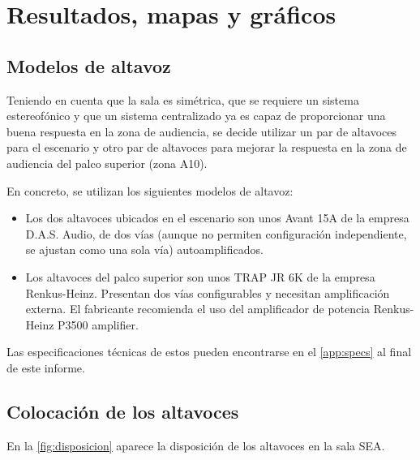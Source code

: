\documentclass{article}
\begin{document}
\section{Resultados, mapas y gráficos}

\subsection{Modelos de altavoz}
Teniendo en cuenta que la sala es simétrica, que se requiere un sistema estereofónico y que un sistema centralizado ya es capaz de proporcionar una buena respuesta en la zona de audiencia, se decide utilizar un par de altavoces para el escenario y otro par de altavoces para mejorar la respuesta en la zona de audiencia del palco superior (zona A10).

En concreto, se utilizan los siguientes modelos de altavoz:

\begin{itemize}
    \item Los dos altavoces ubicados en el escenario son unos Avant 15A de la empresa D.A.S. Audio, de dos vías (aunque no permiten configuración independiente, se ajustan como una sola vía) autoamplificados.
    \item Los altavoces del palco superior son unos TRAP JR 6K de la empresa Renkus-Heinz. Presentan dos vías configurables y necesitan amplificación externa. El fabricante recomienda el uso del amplificador de potencia Renkus-Heinz P3500 amplifier.
\end{itemize}

Las especificaciones técnicas de estos pueden encontrarse en el \autoref{app:specs} al final de este informe.

\subsection{Colocación de los altavoces}

En la \autoref{fig:disposicion} aparece la disposición de los altavoces en la sala SEA.
\end{document}
